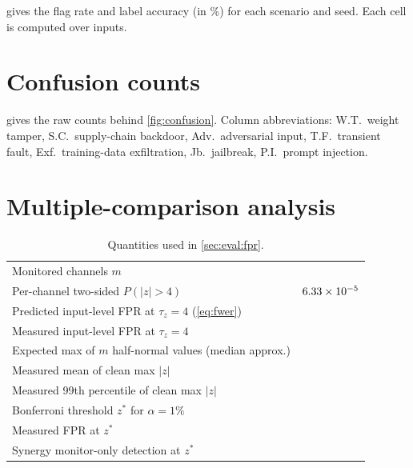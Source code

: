  gives the flag rate and label accuracy (in \%) for each scenario and seed.
Each cell is computed over \NPerSeed{} inputs.

\begin{table}[h]
\centering
\caption{Per-seed flag rate (Flag) and label accuracy (Label), in percent.}
\label{tab:per_seed}
\scriptsize
\setlength{\tabcolsep}{3.5pt}
\resizebox{\textwidth}{!}{}
\end{table}

\section{Confusion counts}

 gives the raw counts behind \cref{fig:confusion}. Column
abbreviations: W.T.\ weight tamper, S.C.\ supply-chain backdoor, Adv.\ adversarial input, T.F.\
transient fault, Exf.\ training-data exfiltration, Jb.\ jailbreak, P.I.\ prompt injection.

\begin{table}[h]
\centering
\caption{Raw label counts per scenario (\NPerScenario{} inputs per row).}
\label{tab:confusion_counts}
\scriptsize
\resizebox{\textwidth}{!}{}
\end{table}

\section{Multiple-comparison analysis}

\begin{table}[h]
\centering
\caption{Quantities used in \cref{sec:eval:fpr}.}
\small
\begin{tabular}{lr}
\toprule
Monitored channels $m$ & \MChannels \\
Per-channel two-sided $P(|z|>4)$ & $6.33\times 10^{-5}$ \\
Predicted input-level FPR at $\tau_z=4$ (\cref{eq:fwer}) & \PredFPRZFour \\
Measured input-level FPR at $\tau_z=4$ & \EmpFPRZFour \\
Expected max of $m$ half-normal values (median approx.) & \ExpMaxGauss \\
Measured mean of clean max $|z|$ & \CleanMaxZMean \\
Measured 99th percentile of clean max $|z|$ & \CleanMaxZPNinetyNine \\
Bonferroni threshold $z^*$ for $\alpha=1\%$ & \ZBonf \\
Measured FPR at $z^*$ & \EmpFPRBonf \\
Synergy monitor-only detection at $z^*$ & \SynergyTPRBonf \\
\bottomrule
\end{tabular}
\end{table}

